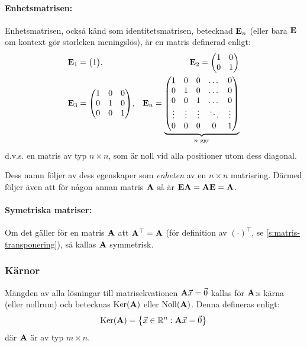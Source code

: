 \paragraph{Enhetsmatrisen:} Enhetsmatrisen, också känd som identitetsmatrisen,
betecknad $\mathbf{E}_n$ (eller bara $\mathbf{E}$ om kontext gör storleken meningslös),
är en matris definerad enligt:
\begin{align*}
	&\mathbf{E}_1=\qty(\begin{matrix}
		1
	\end{matrix}),&\mathbf{E}_2=\qty(\begin{matrix}
		1 & 0\\
		0 & 1
	\end{matrix})&\\
	&\mathbf{E}_3=\qty(\begin{matrix}
		1 & 0 & 0\\
		0 & 1 & 0\\
		0 & 0 & 1
	\end{matrix}),&\mathbf{E}_n=\underbrace{\qty(\begin{matrix}
		1 & 0 & 0 & \dots & 0\\
		0 & 1 & 0 & \dots & 0\\
		0 & 0 & 1 & \dots & 0\\
		\vdots & \vdots & \vdots & \ddots & \vdots\\
		0 & 0 & 0 & 0 & 1
	\end{matrix})}_\text{$n$ ggr}&
\end{align*}
d.v.s. en matris av typ $n\times n$, som är noll vid alla positioner utom dess
diagonal.

Dess namn följer av dess egenskaper som \emph{enheten} av en $n\times n$ matrisring.
Därmed följer även att för någon annan matris $\mathbf{A}$ så är $\mathbf{E}\mathbf{A}=\mathbf{A}\mathbf{E}=\mathbf{A}$.

\paragraph{Symetriska matriser:} Om det gäller för en matris $\mathbf{A}$ att $\mathbf{A}^\top=\mathbf{A}$ (för definition
av $(\cdot)^\top$, se \ref{s:matris-transponering}), så kallas $\mathbf{A}$ symmetrisk.

\subsubsection{Kärnor}
Mängden av alla lösningar till matrisekvationen $\mathbf{A}\vec{x}=\vec{0}$ kallas
för $\mathbf{A}$:s kärna (eller nollrum) och betecknas $\operatorname{Ker}(\mathbf{A})$ eller $\operatorname{Noll}(\mathbf{A})$.
Denna defineras enligt:
$$
	\operatorname{Ker}(\mathbf{A})=\qty{\vec{x}\in\mathbb{R}^n:\mathbf{A}\vec{x}=\vec{0}}
$$
där $\mathbf{A}$ är av typ $m\times n$.

